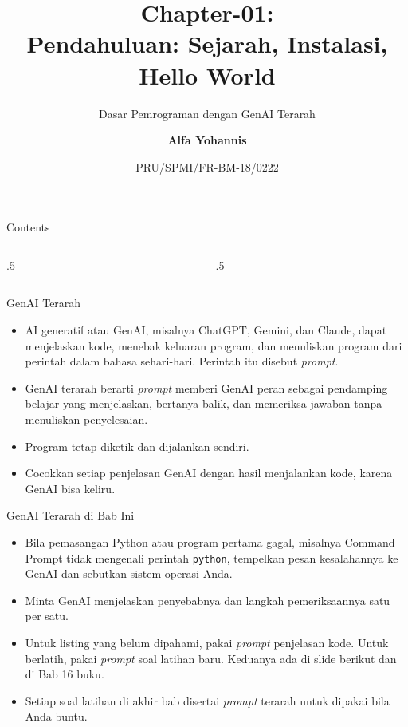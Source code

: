 \documentclass[aspectratio=169, table]{beamer}
\subtitle{Dasar Pemrograman dengan GenAI Terarah}
\title{Chapter-01:\\\LARGE{Pendahuluan: Sejarah, Instalasi,\\Hello World}}
\date[Serial]{\scriptsize {PRU/SPMI/FR-BM-18/0222}}
\author[Pradita]{\small{\textbf{Alfa Yohannis}}}
\begin{document}
\frame{\titlepage}

\begin{frame}[fragile]{Contents}
\vspace{15pt}
\begin{columns}[t]
\begin{column}{.5\textwidth}
\tableofcontents[sections={1-4}]
\end{column}
\begin{column}{.5\textwidth}
\tableofcontents[sections={5-9}]
\end{column}
\end{columns}
\end{frame}

\begin{frame}{GenAI Terarah}
\small
\begin{itemize}
  \item AI generatif atau GenAI, misalnya ChatGPT, Gemini, dan Claude, dapat menjelaskan kode, menebak keluaran program, dan menuliskan program dari perintah dalam bahasa sehari-hari. Perintah itu disebut \textit{prompt}.
  \item GenAI terarah berarti \textit{prompt} memberi GenAI peran sebagai pendamping belajar yang menjelaskan, bertanya balik, dan memeriksa jawaban tanpa menuliskan penyelesaian.
  \item Program tetap diketik dan dijalankan sendiri.
  \item Cocokkan setiap penjelasan GenAI dengan hasil menjalankan kode, karena GenAI bisa keliru.
\end{itemize}
\end{frame}

\begin{frame}{GenAI Terarah di Bab Ini}
\small
\begin{itemize}
  \item Bila pemasangan Python atau program pertama gagal, misalnya Command Prompt tidak mengenali perintah \texttt{python}, tempelkan pesan kesalahannya ke GenAI dan sebutkan sistem operasi Anda.
  \item Minta GenAI menjelaskan penyebabnya dan langkah pemeriksaannya satu per satu.
  \item Untuk listing yang belum dipahami, pakai \textit{prompt} penjelasan kode. Untuk berlatih, pakai \textit{prompt} soal latihan baru. Keduanya ada di slide berikut dan di Bab 16 buku.
  \item Setiap soal latihan di akhir bab disertai \textit{prompt} terarah untuk dipakai bila Anda buntu.
\end{itemize}
\end{frame}
\end{document}
